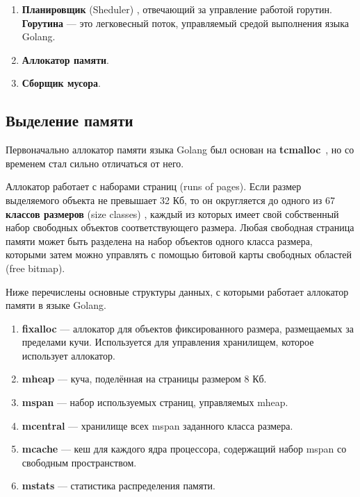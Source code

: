 \begin{enumerate}[label*=\arabic*.]
	\item \textbf{Планировщик} (Sheduler) \cite{golang_scheduler}, отвечающий за управление работой горутин. \textbf{Горутина} --- это легковесный поток, управляемый средой выполнения языка Golang. \cite{golang_goroutine}
	\item \textbf{Аллокатор памяти}.
	\item \textbf{Сборщик мусора}.
\end{enumerate}

\subsection{Выделение памяти}

Первоначально аллокатор памяти языка Golang был основан на \textbf{tcmalloc}~\cite{tcmalloc}, но со временем стал сильно отличаться от него. \cite{golang_malloc} 

Аллокатор работает с наборами страниц (runs of pages). Если размер выделяемого объекта не превышает 32 Кб, то он округляется до одного из 67 \textbf{классов размеров} (size classes) \cite{golang_size_classes}, каждый из которых имеет свой собственный набор свободных объектов соответствующего размера. Любая свободная страница памяти может быть разделена на набор объектов одного класса размера, которыми затем можно управлять с помощью битовой карты свободных областей (free bitmap). \cite{golang_malloc}

Ниже перечислены основные структуры данных, с которыми работает аллокатор памяти в языке Golang. \cite{golang_malloc}

\begin{enumerate}[label*=\arabic*.]
	\item \textbf{fixalloc} \cite{golang_fixalloc} --- аллокатор для объектов фиксированного размера, размещаемых за пределами кучи. Используется для управления хранилищем, которое использует аллокатор.
	\item \textbf{mheap} --- куча, поделённая на страницы размером 8 Кб.
	\item \textbf{mspan} --- набор используемых страниц, управляемых mheap.
	\item \textbf{mcentral} --- хранилище всех mspan заданного класса размера.
	\item \textbf{mcache} --- кеш для каждого ядра процессора, содержащий набор mspan со свободным пространством.
	\item \textbf{mstats} --- статистика распределения памяти.
\end{enumerate}

